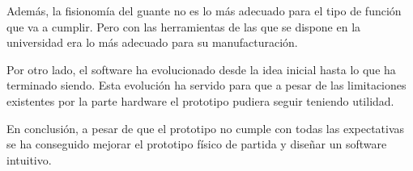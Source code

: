 Además, la fisionomía del guante no es lo más adecuado para el tipo de función que va a cumplir. Pero con las herramientas de las que se dispone en la universidad era lo más adecuado para su manufacturación. 

Por otro lado, el software ha evolucionado desde la idea inicial hasta lo que ha terminado siendo. Esta evolución ha servido para que a pesar de las limitaciones existentes por la parte hardware el prototipo pudiera seguir teniendo utilidad.

En conclusión, a pesar de que el prototipo no cumple con todas las expectativas se ha conseguido mejorar el prototipo físico de partida y diseñar un software intuitivo.

